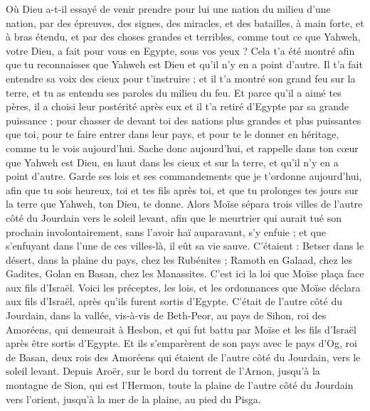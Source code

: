 \begin{multicols}{2}
Où Dieu a-t-il essayé de venir prendre pour lui une nation du milieu d'une nation, par des épreuves, des signes, des miracles, et des batailles, à main forte, et à bras étendu, et par des choses grandes et terribles, comme tout ce que Yahweh, votre Dieu, a fait pour vous en Egypte, sous vos yeux ?
Cela t'a été montré afin que tu reconnaisses que Yahweh est Dieu et qu'il n'y en a point d'autre.
Il t'a fait entendre sa voix des cieux pour t'instruire ; et il t'a montré son grand feu sur la terre, et tu as entendu ses paroles du milieu du feu.
Et parce qu'il a aimé tes pères, il a choisi leur postérité après eux et il t'a retiré d'Egypte par sa grande puissance ;
pour chasser de devant toi des nations plus grandes et plus puissantes que toi, pour te faire entrer dans leur pays, et pour te le donner en héritage, comme tu le vois aujourd'hui.
Sache donc aujourd'hui, et rappelle dans ton cœur que Yahweh est Dieu, en haut dans les cieux et sur la terre, et qu'il n'y en a point d'autre.
Garde ses lois et ses commandements que je t'ordonne aujourd'hui, afin que tu sois heureux, toi et tes fils après toi, et que tu prolonges tes jours sur la terre que Yahweh, ton Dieu, te donne.
Alors Moïse sépara trois villes de l'autre côté du Jourdain vers le soleil levant,
afin que le meurtrier qui aurait tué son prochain involontairement, sans l'avoir haï auparavant, s'y enfuie ; et que s'enfuyant dans l'une de ces villes-là, il eût sa vie sauve.
C'étaient : Betser dans le désert, dans la plaine du pays, chez les Rubénites ; Ramoth en Galaad, chez les Gadites, Golan en Basan, chez les Manassites.
C'est ici la loi que Moïse plaça face aux fils d'Israël.
Voici les préceptes, les lois, et les ordonnances que Moïse déclara aux fils d'Israël, après qu'ils furent sortis d'Egypte.
C'était de l'autre côté du Jourdain, dans la vallée, vis-à-vis de Beth-Peor, au pays de Sihon, roi des Amoréens, qui demeurait à Hesbon, et qui fut battu par Moïse et les fils d'Israël après être sortis d'Egypte.
Et ils s'emparèrent de son pays avec le pays d'Og, roi de Basan, deux rois des Amoréens qui étaient de l'autre côté du Jourdain, vers le soleil levant.
Depuis Aroër, sur le bord du torrent de l'Arnon, jusqu'à la montagne de Sion, qui est l'Hermon,
toute la plaine de l'autre côté du Jourdain vers l'orient, jusqu'à la mer de la plaine, au pied du Pisga.

\end{multicols}
